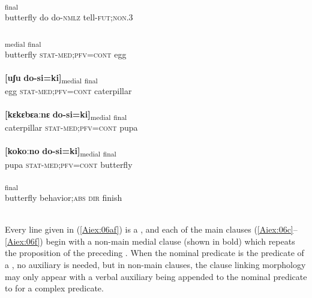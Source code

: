\documentclass[output=paper]{LSP/langsci}
\begin{document}
\begin{exe}
\ex \label{Aiex:06af}
\begin{xlist}
\ex \label{Aiex:06a}
\textsubscript{final}\\
butterfly do do-\textsc{nmlz} tell-\textsc{fut};\textsc{non}.\textsc{3}\\
\glt {}\\
\ex \label{Aiex:06b}
\gll [ɛjaːgɛ	do-si=ki]\textsubscript{medial} \underline{\smash{[uʃu]}}\textsubscript{final}\\
butterfly \textsc{stat}-\textsc{med};\textsc{pfv}=\textsc{cont} egg\\
\glt {}\\
\ex \label{Aiex:06c}
\gll \textbf{[uʃu}	\textbf{do-si=ki]}\textsubscript{medial}	\underline{\smash{[kɛkɛbɛaːnɛ]}}\textsubscript{final}\\
egg	\textsc{stat}-\textsc{med};\textsc{pfv}=\textsc{cont} caterpillar\\
\glt {}\\
\ex \label{Aiex:06d}
\gll \textbf{[kɛkɛbɛaːnɛ} \textbf{do-si=ki]}\textsubscript{medial} \underline{\smash{[kokoːno]}}\textsubscript{final}\\
caterpillar \textsc{stat}-\textsc{med;}\textsc{pfv}=\textsc{cont} pupa\\
\glt {}\\
\ex \label{Aiex:06e}
\gll \textbf{[kokoːno} \textbf{do-si=ki]}\textsubscript{medial} \underline{\smash{[ɛjaːgɛ]}}\textsubscript{final}\\
pupa \textsc{stat}-\textsc{med};\textsc{pfv}=\textsc{cont} butterfly\\
\glt {}\\
\ex \label{Aiex:06f}
\textsubscript{final}\\
butterfly	behavior;\textsc{abs} \textsc{dir}	finish\\
\glt {}\\
\end{xlist}
\end{exe}

Every line given in (\ref{Aiex:06af}) is a , and each of the main clauses (\ref{Aiex:06c}--\ref{Aiex:06f}) begin with a non-main medial
clause (shown in bold) which repeats the proposition of the preceding . When the nominal
predicate is the predicate of a , no auxiliary is needed, but in non-main clauses, the clause
linking morphology may only appear with a verbal auxiliary being appended to the nominal predicate to
for a complex predicate.
\end{document}
